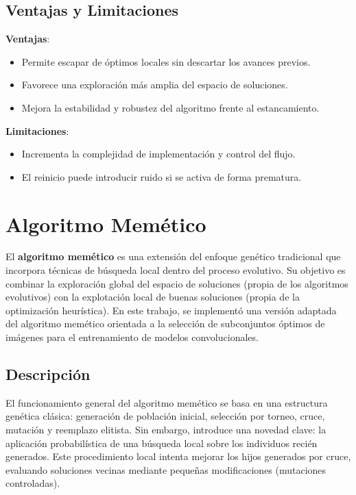 \subsection{Ventajas y Limitaciones}\label{subsec:ventajas-y-limitaciones-genetico-v3}
\textbf{Ventajas}:
\begin{itemize}
      \item Permite escapar de óptimos locales sin descartar los avances previos.
      \item Favorece una exploración más amplia del espacio de soluciones.
      \item Mejora la estabilidad y robustez del algoritmo frente al estancamiento.
\end{itemize}

\textbf{Limitaciones}:
\begin{itemize}
      \item Incrementa la complejidad de implementación y control del flujo.
      \item El reinicio puede introducir ruido si se activa de forma prematura.
\end{itemize}

\section{Algoritmo Memético}\label{sec:algoritmo-memetico}
El \textbf{algoritmo memético} es una extensión del enfoque genético tradicional que incorpora técnicas de búsqueda
local dentro del proceso evolutivo.
Su objetivo es combinar la exploración global del espacio de soluciones (propia de los algoritmos evolutivos)
con la explotación local de buenas soluciones (propia de la optimización heurística).
En este trabajo, se implementó una versión adaptada del algoritmo memético orientada a la selección de subconjuntos
óptimos de imágenes para el entrenamiento de modelos convolucionales.


\subsection{Descripción}\label{subsec:descripcion-memetico}
El funcionamiento general del algoritmo memético se basa en una estructura genética clásica:
generación de población inicial, selección por torneo, cruce, mutación y reemplazo elitista.
Sin embargo, introduce una novedad clave: la aplicación probabilística de una búsqueda local sobre los individuos recién generados.
Este procedimiento local intenta mejorar los hijos generados por cruce, evaluando soluciones vecinas
mediante pequeñas modificaciones (mutaciones controladas).

